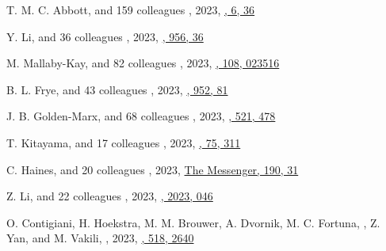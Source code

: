 \begin{etaremune}
\item
T. M. C. Abbott, and 159 colleagues
,
2023, \href{https://ui.adsabs.harvard.edu/abs/2023OJAp....6E..36A}{\oja, 6, 36}

\item
Y. Li, and 36 colleagues
,
2023, \href{https://ui.adsabs.harvard.edu/abs/2023ApJ...956...36L}{\apj, 956, 36}

\item
M. Mallaby-Kay, and 82 colleagues
,
2023, \href{https://ui.adsabs.harvard.edu/abs/2023PhRvD.108b3516M}{\prd, 108, 023516}

\item
B. L. Frye, and 43 colleagues
,
2023, \href{https://ui.adsabs.harvard.edu/abs/2023ApJ...952...81F}{\apj, 952, 81}

\item
J. B. Golden-Marx, and 68 colleagues
,
2023, \href{https://ui.adsabs.harvard.edu/abs/2023MNRAS.521..478G}{\mnras, 521, 478}

\item
T. Kitayama, and 17 colleagues
,
2023, \href{https://ui.adsabs.harvard.edu/abs/2023PASJ...75..311K}{\pasj, 75, 311}

\item
C. Haines, and 20 colleagues
,
2023, \href{https://ui.adsabs.harvard.edu/abs/2023Msngr.190...31H}{The Messenger, 190, 31}

\item
Z. Li, and 22 colleagues
,
2023, \href{https://ui.adsabs.harvard.edu/abs/2023JCAP...02..046L}{\jcap, 2023, 046}

\item
O. Contigiani, H. Hoekstra, M. M. Brouwer, A. Dvornik, M. C. Fortuna, \myself, Z. Yan, and M. Vakili,
,
2023, \href{https://ui.adsabs.harvard.edu/abs/2023MNRAS.518.2640C}{\mnras, 518, 2640}



\end{etaremune}
